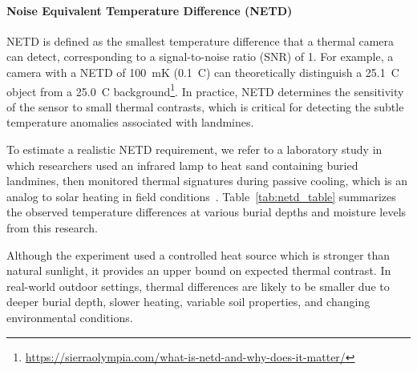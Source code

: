 \paragraph{Noise Equivalent Temperature Difference (NETD)}

NETD is defined as the smallest temperature difference that a thermal camera can detect, corresponding to a signal-to-noise ratio (SNR) of 1. For example, a camera with a NETD of 100~mK (0.1~\textdegree C) can theoretically distinguish a 25.1~\textdegree C object from a 25.0~\textdegree C background\footnote{\url{https://sierraolympia.com/what-is-netd-and-why-does-it-matter/}}. In practice, NETD determines the sensitivity of the sensor to small thermal contrasts, which is critical for detecting the subtle temperature anomalies associated with landmines.

To estimate a realistic NETD requirement, we refer to a laboratory study in which researchers used an infrared lamp to heat sand containing buried landmines, then monitored thermal signatures during passive cooling, which is an analog to solar heating in field conditions~\cite{lamorski2002thermal}. Table~\ref{tab:netd_table} summarizes the observed temperature differences at various burial depths and moisture levels from this research.

Although the experiment used a controlled heat source which is stronger than natural sunlight, it provides an upper bound on expected thermal contrast. In real-world outdoor settings, thermal differences are likely to be smaller due to deeper burial depth, slower heating, variable soil properties, and changing environmental conditions.

